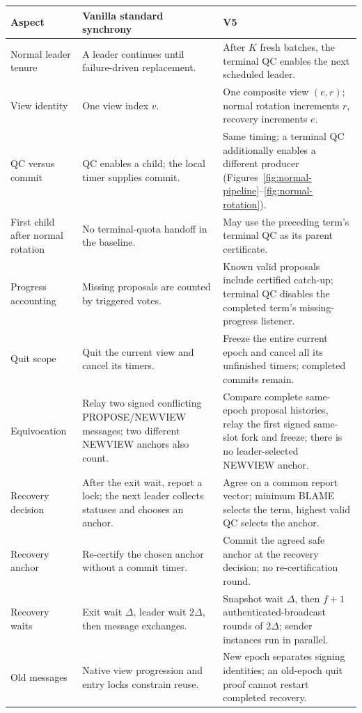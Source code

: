 \documentclass[10pt,a4paper]{article}
\begin{document}
\begin{center}\small
\begin{tabularx}{\linewidth}{@{}>{\raggedright\arraybackslash}p{.18\linewidth}>{\raggedright\arraybackslash}p{.32\linewidth}Y@{}}
\toprule
Aspect & Vanilla standard synchrony & V5\\\midrule
Normal leader tenure & A leader continues until failure-driven replacement. &
After $K$ fresh batches, the terminal QC enables the next scheduled leader.\\
View identity & One view index $v$. & One composite view $(e,r)$;
normal rotation increments $r$, recovery increments $e$.\\
QC versus commit & QC enables a child; the local timer supplies commit. &
Same timing; a terminal QC additionally enables a different producer
(Figures~\ref{fig:normal-pipeline}--\ref{fig:normal-rotation}).\\
First child after normal rotation & No terminal-quota handoff in the baseline. &
May use the preceding term's terminal QC as its parent certificate.\\
Progress accounting & Missing proposals are counted by triggered votes. &
Known valid proposals include certified catch-up; terminal QC disables the
completed term's missing-progress listener.\\
Quit scope & Quit the current view and cancel its timers. & Freeze the entire
current epoch and cancel all its unfinished timers; completed commits remain.\\
Equivocation & Relay two signed conflicting PROPOSE/NEWVIEW messages;
two different NEWVIEW anchors also count. & Compare complete same-epoch
proposal histories, relay the first signed same-slot fork and freeze;
there is no leader-selected NEWVIEW anchor.\\
Recovery decision & After the exit wait, report a lock; the next leader
collects statuses and chooses an anchor. & Agree on a common report vector;
minimum BLAME selects the term, highest valid QC selects the anchor.\\
Recovery anchor & Re-certify the chosen anchor without a commit timer. &
Commit the agreed safe anchor at the recovery decision; no re-certification round.\\
Recovery waits & Exit wait $\Delta$, leader wait $2\Delta$, then message
exchanges. & Snapshot wait $\Delta$, then $f+1$ authenticated-broadcast rounds
of $2\Delta$; sender instances run in parallel.\\
Old messages & Native view progression and entry locks constrain reuse. &
New epoch separates signing identities; an old-epoch quit proof cannot
restart completed recovery.\\\bottomrule
\end{tabularx}\end{center}
\end{document}
